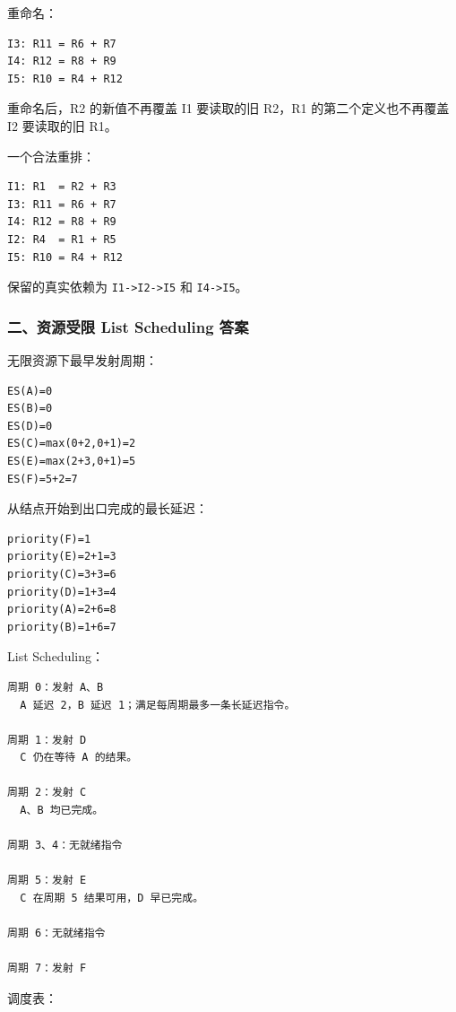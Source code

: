 \documentclass[UTF8]{ctexart}
\begin{document}
重命名：

\begin{Verbatim}[fontsize=\small,breaklines=true]
I3: R11 = R6 + R7
I4: R12 = R8 + R9
I5: R10 = R4 + R12
\end{Verbatim}

重命名后，R2 的新值不再覆盖 I1 要读取的旧 R2，R1 的第二个定义也不再覆盖 I2 要读取的旧 R1。

一个合法重排：

\begin{Verbatim}[fontsize=\small,breaklines=true]
I1: R1  = R2 + R3
I3: R11 = R6 + R7
I4: R12 = R8 + R9
I2: R4  = R1 + R5
I5: R10 = R4 + R12
\end{Verbatim}

保留的真实依赖为 \texttt{I1->I2->I5} 和 \texttt{I4->I5}。

\subsubsection*{二、资源受限 List Scheduling 答案}

无限资源下最早发射周期：

\begin{Verbatim}[fontsize=\small,breaklines=true]
ES(A)=0
ES(B)=0
ES(D)=0
ES(C)=max(0+2,0+1)=2
ES(E)=max(2+3,0+1)=5
ES(F)=5+2=7
\end{Verbatim}

从结点开始到出口完成的最长延迟：

\begin{Verbatim}[fontsize=\small,breaklines=true]
priority(F)=1
priority(E)=2+1=3
priority(C)=3+3=6
priority(D)=1+3=4
priority(A)=2+6=8
priority(B)=1+6=7
\end{Verbatim}

List Scheduling：

\begin{Verbatim}[fontsize=\small,breaklines=true]
周期 0：发射 A、B
  A 延迟 2，B 延迟 1；满足每周期最多一条长延迟指令。

周期 1：发射 D
  C 仍在等待 A 的结果。

周期 2：发射 C
  A、B 均已完成。

周期 3、4：无就绪指令

周期 5：发射 E
  C 在周期 5 结果可用，D 早已完成。

周期 6：无就绪指令

周期 7：发射 F
\end{Verbatim}

调度表：
\end{document}

